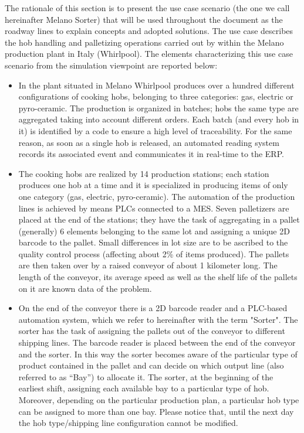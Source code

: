 The rationale of this section is to present the use case scenario (the one we call hereinafter Melano Sorter) that will be used throughout the document as the roadway lines to explain concepts and adopted solutions.
The use case describes the hob handling and palletizing operations carried out by within the Melano production plant in Italy (Whirlpool). The elements characterizing this use case scenario from the simulation viewpoint are reported below:

\begin{itemize}
\item In the plant situated in Melano Whirlpool produces over a hundred different configurations of cooking hobs, belonging to three categories: gas, electric or pyro-ceramic. The production is organized in batches;  hobs the same type are aggregated taking into account different orders. Each batch (and every hob in it)  is identified by a code to ensure a high level of traceability. For the same reason, as soon as a single hob is released, an automated reading system records its associated event and communicates it in real-time to the ERP. 
\item The cooking hobs are realized by 14 production stations; each station produces one hob at a time and it is specialized in producing items of only one category (gas, electric, pyro-ceramic).  The automation of the production lines is achieved by means PLCs connected to a MES. Seven palletizers are placed at the end of the stations; they have the task of aggregating in a pallet (generally) 6 elements belonging to the same lot and assigning a unique 2D barcode to the pallet. Small differences in lot size are to be ascribed to the quality control process (affecting about 2\% of items produced). The pallets are then taken over by a raised conveyor of about 1 kilometer long. The length of the conveyor, its average speed as well as the shelf life of the pallets on it are known data of the problem. 
\item On the end of the conveyor there is a 2D barcode reader and a PLC-based automation system, which we refer to hereinafter with the term "Sorter". The sorter has the task of assigning the pallets out of the conveyor to different shipping lines. The barcode reader is placed between the end of the conveyor and the sorter. In this way the sorter becomes aware of the particular type of product contained in the pallet and can decide on which output line (also referred to as “Bay”) to allocate it. The sorter, at the beginning of the earliest shift, assigning each available bay to a particular type of hob. Moreover, depending on the particular production plan, a particular hob type can be assigned to more than one bay. Please notice that, until the next day the hob type/shipping line configuration cannot be modified. 

\end{itemize}
